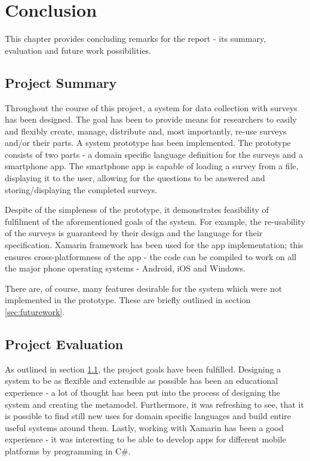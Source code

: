 \chapter{Conclusion}
\label{chap:conclusion}
This chapter provides concluding remarks for the report - its summary, evaluation and future work possibilities.

\section{Project Summary}
\label{sec:summary}
Throughout the course of this project, a system for data collection with surveys has been designed. The goal has been to provide means for researchers to easily and flexibly create, manage, distribute and, most importantly, re-use surveys and/or their parts. 
A system prototype has been implemented. The prototype consists of two parts - a domain specific language definition for the surveys and a smartphone app. The smartphone app is capable of loading a survey from a file, displaying it to the user, allowing for the questions to be answered and storing/displaying the completed surveys.

Despite of the simpleness of the prototype, it demonstrates feasibility of fulfilment of the aforementioned goals of the system. For example, the re-usability of the surveys is guaranteed by their design and the language for their specification. Xamarin framework has been used for the app implementation; this ensures cross-platformness of the app - the code can be compiled to work on all the major phone operating systems - Android, iOS and Windows.

There are, of course, many features desirable for the system which were not implemented in the prototype. These are briefly outlined in section \ref{sec:futurework}.

\section{Project Evaluation}
\label{sec:evaluation}
As outlined in section \ref{sec:summary}, the project goals have been fulfilled. Designing a system to be as flexible and extensible as possible has been an educational experience - a lot of thought has been put into the process of designing the system and creating the metamodel. Furthermore, it was refreshing to see, that it is possible to find still new uses for domain specific languages and build entire useful systems around them. Lastly, working with Xamarin has been a good experience - it was interesting to be able to develop apps for different mobile platforms by programming in C\#.

